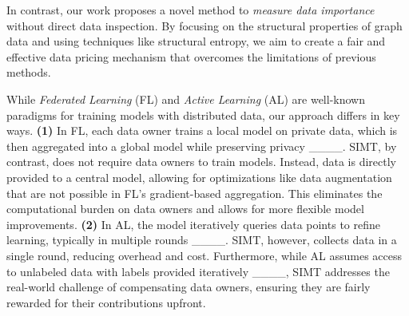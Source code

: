 In contrast, our work proposes a novel method to \emph{measure data importance} without direct data inspection. By focusing on the structural properties of graph data and using techniques like structural entropy, we aim to create a fair and effective data pricing mechanism that overcomes the limitations of previous methods.



 While {\em Federated Learning} (FL) and {\em Active Learning} (AL) are well-known paradigms for training models with distributed data, our approach differs in key ways.
{\bf (1)} In FL, each data owner trains a local model on private data, which is then aggregated into a global model while preserving privacy ____. SIMT, by contrast, does not require data owners to train models. Instead, data is directly provided to a central model, allowing for optimizations like data augmentation that are not possible in FL's gradient-based aggregation. This eliminates the computational burden on data owners and allows for more flexible model improvements. {\bf (2)} In AL, the model iteratively queries data points to refine learning, typically in multiple rounds ____. SIMT, however, collects data in a single round, reducing overhead and cost. Furthermore, while AL assumes access to unlabeled data with labels provided iteratively ____, SIMT addresses the real-world challenge of compensating data owners, ensuring they are fairly rewarded for their contributions upfront.